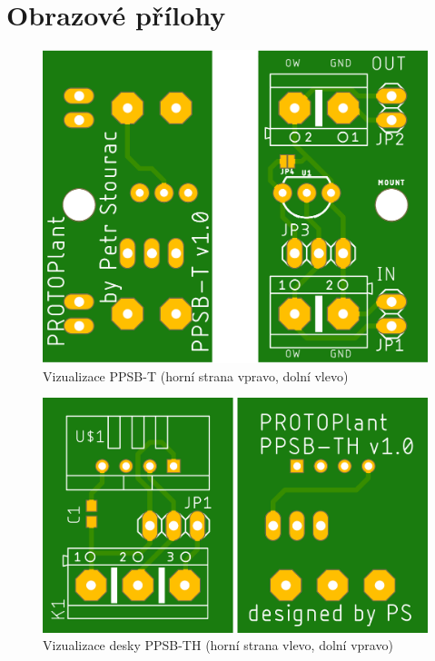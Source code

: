 \chapter{Obrazové přílohy}

\begin{figure}[h]
    \centering
    \includegraphics[width=\textwidth]{img/HARDWARE/PPSB-T_BOTH.png}
    \caption{Vizualizace PPSB-T (horní strana vpravo, dolní vlevo)}
    \label{fig:PPSB-T_VISUAL}
\end{figure}

\begin{figure}[h]
    \centering
    \includegraphics[width=\textwidth]{img/HARDWARE/PPSB-TH_BOTH.png}
    \caption{Vizualizace desky PPSB-TH (horní strana vlevo, dolní vpravo)}
    \label{fig:PPSB-TH_VISUAL}
\end{figure}

